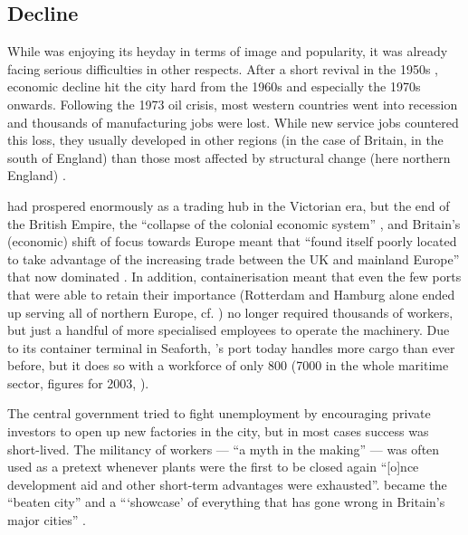 		\subsection{Decline}\label{sec.hist.20.decline}

While  was enjoying its heyday in terms of image and popularity, it was already facing serious difficulties in other respects. After a short revival in the 1950s \citep[cf.][402]{murden2006}, economic decline hit the city hard from the 1960s and especially the 1970s onwards.
Following the 1973 oil crisis, most western countries went into recession and thousands of manufacturing jobs were lost.
While new service jobs countered this loss, they usually developed in other regions (in the case of Britain, in the south of England) than those most affected by structural change (here northern England) \citep[cf.][16--17]{juddparkinson1990a}.

 had prospered enormously as a trading hub in the Victorian era, but the end of the British Empire, the ``collapse of the colonial economic system'' \citep[52]{belchem2006a}, and Britain's (economic) shift of focus towards Europe meant that  ``found itself poorly located to take advantage of the increasing trade between the UK and mainland Europe'' that now dominated \citep[166--167]{couch2003a}.
In addition, containerisation meant that even the few ports that were able to retain their importance (Rotterdam and Hamburg alone ended up serving all of northern Europe, cf. \citealt[264]{milne2006}) no longer required thousands of workers, but just a handful of more specialised employees to operate the machinery.
Due to its container terminal in Seaforth, 's port today handles more cargo than ever before, but it does so with a workforce of only 800 (7000 in the whole maritime sector, figures for 2003, \citealt[cf.][477]{murden2006}).

The central government tried to fight unemployment by encouraging private investors to open up new factories in the city, but in most cases success was short-lived.
The militancy of  workers --- ``a myth in the making'' --- was often used as a pretext whenever  plants were the first to be closed again ``[o]nce development aid and other short-term advantages were exhausted''\citep[cf.][52]{belchem2006a}.
 became the ``beaten city'' and a ```showcase' of everything that has gone wrong in Britain's major cities'' \citep[\emph{Daily Mirror}, 11 October 1982, cited in][52--53]{belchem2006a}.

